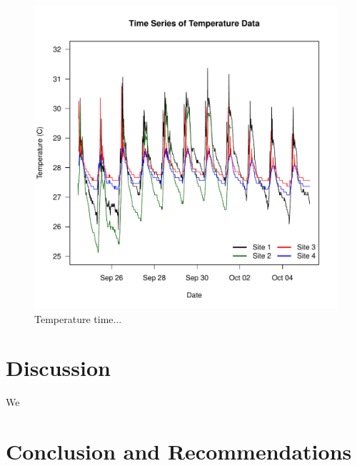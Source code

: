 \documentclass{article}\usepackage[]{graphicx}\usepackage[]{color}
\begin{document}
\begin{figure}
\includegraphics{Figures/Temp}
\caption{Temperature time...}
\label{Temp}
\end{figure}

\section{Discussion}
We

\section{Conclusion and Recommendations}
\end{document}
